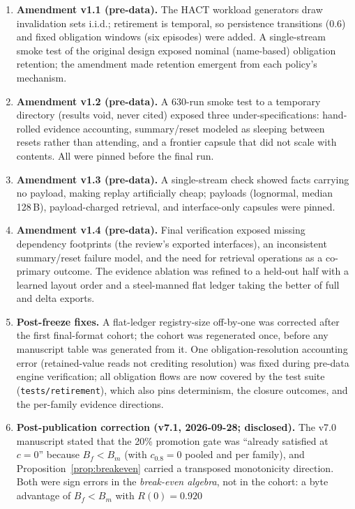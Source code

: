 \begin{enumerate}[leftmargin=*,itemsep=2pt]
\item \textbf{Amendment v1.1 (pre-data).} The HACT workload generators
draw invalidation sets i.i.d.; retirement is temporal, so persistence
transitions (0.6) and fixed obligation windows (six episodes) were
added. A single-stream smoke test of the original design exposed
nominal (name-based) obligation retention; the amendment made
retention emergent from each policy's mechanism.
\item \textbf{Amendment v1.2 (pre-data).} A 630-run smoke test to a
temporary directory (results void, never cited) exposed three
under-specifications: hand-rolled evidence accounting, summary/reset
modeled as sleeping between resets rather than attending, and a
frontier capsule that did not scale with contents. All were pinned
before the final run.
\item \textbf{Amendment v1.3 (pre-data).} A single-stream check
showed facts carrying no payload, making replay artificially cheap;
payloads (lognormal, median 128\,B), payload-charged retrieval, and
interface-only capsules were pinned.
\item \textbf{Amendment v1.4 (pre-data).} Final verification exposed
missing dependency footprints (the review's exported interfaces), an
inconsistent summary/reset failure model, and the need for retrieval
operations as a co-primary outcome. The evidence ablation was refined
to a held-out half with a learned layout order and a steel-manned
flat ledger taking the better of full and delta exports.
\item \textbf{Post-freeze fixes.} A flat-ledger registry-size
off-by-one was corrected after the first final-format cohort; the
cohort was regenerated once, before any manuscript table was
generated from it. One obligation-resolution accounting error
(retained-value reads not crediting resolution) was fixed during
pre-data engine verification; all obligation flows are now covered by
the test suite (\texttt{tests/retirement}), which also pins
determinism, the closure outcomes, and the per-family evidence
directions.
\item \textbf{Post-publication correction (v7.1, 2026-09-28;
disclosed).} The v7.0 manuscript stated that the 20\% promotion gate
was ``already satisfied at $c=0$'' because $B_f<B_m$ (with
$c_{0.8}=0$ pooled and per family), and
Proposition~\ref{prop:breakeven} carried a transposed monotonicity
direction. Both were sign errors in the \emph{break-even algebra},
not in the cohort: a byte advantage of $B_f<B_m$ with $R(0)=0.920$

\end{enumerate}

